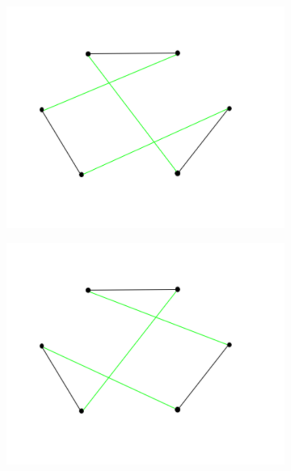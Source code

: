 \begin{figure}[h!]
\begin{subfigure}[b]{0.24\linewidth}
    \includegraphics[width=\linewidth]{media/3opt5.png}
     \caption{}
  \end{subfigure}
  \begin{subfigure}[b]{0.24\linewidth}
    \includegraphics[width=\linewidth]{media/3opt6.png}
    \caption{}
  \end{subfigure}
  \begin{subfigure}[b]{0.24\linewidth}

\end{subfigure}
\end{figure}
